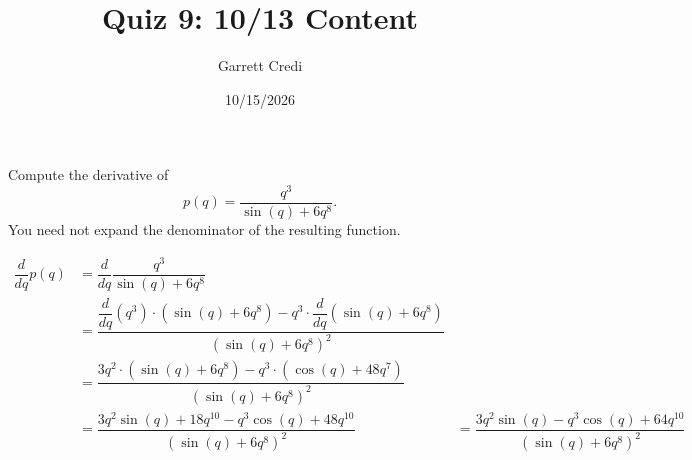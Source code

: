 \documentclass[addpoints,12pt]{exam}
\title{Quiz 9: 10/13 Content}
\author{Garrett Credi}
\date{10/15/2026}
\begin{document}
\maketitle

\newpage

\begin{questions}
  \question[5] Compute the derivative of
  \begin{equation}
    p(q) = \dfrac{q^3}{\sin(q)+6q^8}.
  \end{equation}
  You need not expand the denominator of the resulting function.
  \begin{solution}
    \begin{align}
      \dfrac{d}{dq} p(q) &= \dfrac{d}{dq} \dfrac{q^3}{\sin(q)+6q^8} \\
                         &= \dfrac{\dfrac{d}{dq} (q^3) \cdot (\sin(q) + 6q^8) - q^3 \cdot \dfrac{d}{dq}(\sin(q) + 6q^8)}{(\sin(q) + 6q^8)^2} \\
                         &= \dfrac{3q^2 \cdot (\sin(q) + 6q^8) - q^3 \cdot (\cos(q) + 48q^7)}{(\sin(q) + 6q^8)^2} \\
                         &= \dfrac{3q^2 \sin(q) + 18q^{10} - q^3 \cos(q) + 48q^{10}}{(\sin(q)+6q^8)^2}
                         &= \dfrac{3q^2 \sin(q) - q^3 \cos(q) + 64 q^{10}}{(\sin(q) + 6q^8)^2}
    \end{align}
  \end{solution}

\end{questions}
\end{document}
